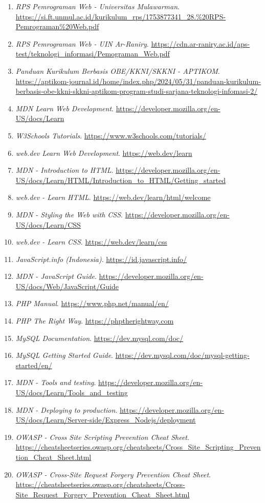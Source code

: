 \documentclass[12pt,a4paper]{article}
\begin{document}
\begin{enumerate}[leftmargin=*]
  \item \textit{RPS Pemrograman Web - Universitas Mulawarman}. \url{https://si.ft.unmul.ac.id/kurikulum_rps/1753877341_28.%20RPS-Pemrograman%20Web.pdf}
  \item \textit{RPS Pemrograman Web - UIN Ar-Raniry}. \url{https://cdn.ar-raniry.ac.id/aps-test/teknologi_informasi/Pemograman_Web.pdf}
  \item \textit{Panduan Kurikulum Berbasis OBE/KKNI/SKKNI - APTIKOM}. \url{https://aptikom-journal.id/home/index.php/2024/05/31/panduan-kurikulum-berbasis-obe-kkni-skkni-aptikom-program-studi-sarjana-teknologi-infomasi-2/}
  \item \textit{MDN Learn Web Development}. \url{https://developer.mozilla.org/en-US/docs/Learn}
  \item \textit{W3Schools Tutorials}. \url{https://www.w3schools.com/tutorials/}
  \item \textit{web.dev Learn Web Development}. \url{https://web.dev/learn}
  \item \textit{MDN - Introduction to HTML}. \url{https://developer.mozilla.org/en-US/docs/Learn/HTML/Introduction_to_HTML/Getting_started}
  \item \textit{web.dev - Learn HTML}. \url{https://web.dev/learn/html/welcome}
  \item \textit{MDN - Styling the Web with CSS}. \url{https://developer.mozilla.org/en-US/docs/Learn/CSS}
  \item \textit{web.dev - Learn CSS}. \url{https://web.dev/learn/css}
  \item \textit{JavaScript.info (Indonesia)}. \url{https://id.javascript.info/}
  \item \textit{MDN - JavaScript Guide}. \url{https://developer.mozilla.org/en-US/docs/Web/JavaScript/Guide}
  \item \textit{PHP Manual}. \url{https://www.php.net/manual/en/}
  \item \textit{PHP The Right Way}. \url{https://phptherightway.com}
  \item \textit{MySQL Documentation}. \url{https://dev.mysql.com/doc/}
  \item \textit{MySQL Getting Started Guide}. \url{https://dev.mysql.com/doc/mysql-getting-started/en/}
  \item \textit{MDN - Tools and testing}. \url{https://developer.mozilla.org/en-US/docs/Learn/Tools_and_testing}
  \item \textit{MDN - Deploying to production}. \url{https://developer.mozilla.org/en-US/docs/Learn/Server-side/Express_Nodejs/deployment}
  \item \textit{OWASP - Cross Site Scripting Prevention Cheat Sheet}. \url{https://cheatsheetseries.owasp.org/cheatsheets/Cross_Site_Scripting_Prevention_Cheat_Sheet.html}
  \item \textit{OWASP - Cross-Site Request Forgery Prevention Cheat Sheet}. \url{https://cheatsheetseries.owasp.org/cheatsheets/Cross-Site_Request_Forgery_Prevention_Cheat_Sheet.html}
\end{enumerate}
\end{document}
